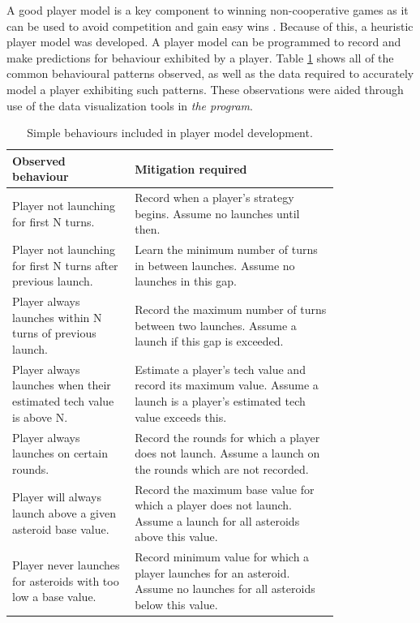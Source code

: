 \documentclass[11pt, twoside]{article}
\begin{document}
A good player model is a key component to winning non-cooperative games as it can be used to avoid competition and gain easy wins \cite{nash1951non}. Because of this, a heuristic player model was developed. A player model can be programmed to record and make predictions for behaviour exhibited by a player. Table \ref{tab:playerModel} shows all of the common behavioural patterns observed, as well as the data required to accurately model a player exhibiting such patterns. These observations were aided through use of the data visualization tools in \textit{the program}.

\begin{table}[b!]
	\centering
	\caption{Simple behaviours included in player model development.}
	\label{tab:playerModel}
	\begin{tabular}{p{0.3\linewidth}>{\raggedright\arraybackslash}p{0.5\linewidth}}
		\toprule
		\textbf{Observed behaviour} & \textbf{Mitigation required} \\
		\midrule
		Player not launching for first N turns. & Record when a player's strategy begins. Assume no launches until then. \\
		Player not launching for first N turns after previous launch. & Learn the minimum number of turns in between launches. Assume no launches in this gap. \\
		Player always launches within N turns of previous launch. & Record the maximum number of turns between two launches. Assume a launch if this gap is exceeded. \\
		Player always launches when their estimated tech value is above N. & Estimate a player's tech value and record its maximum value. Assume a launch is a player's estimated tech value exceeds this. \\
		Player always launches on certain rounds. & Record the rounds for which a player does not launch. Assume a launch on the rounds which are not recorded. \\
		Player will always launch above a given asteroid base value. & Record the maximum base value for which a player does not launch. Assume a launch for all asteroids above this value. \\
		Player never launches for asteroids with too low a base value. & Record minimum value for which a player launches for an asteroid. Assume no launches for all asteroids below this value. \\
		\bottomrule
	\end{tabular}
\end{table}
\end{document}
